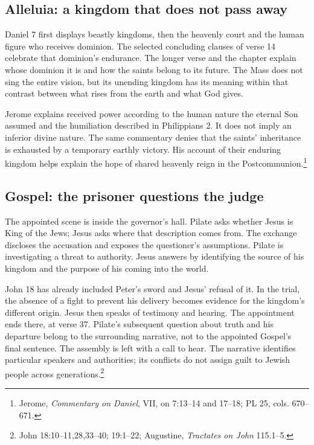 \subsection{Alleluia: a kingdom that does not pass away}
Daniel 7 first displays beastly kingdoms, then the heavenly court and the human figure who receives dominion. The selected concluding clauses of verse 14 celebrate that dominion's endurance. The longer verse and the chapter explain whose dominion it is and how the saints belong to its future. The Mass does not sing the entire vision, but its unending kingdom has its meaning within that contrast between what rises from the earth and what God gives.

Jerome explains received power according to the human nature the eternal Son assumed and the humiliation described in Philippians 2. It does not imply an inferior divine nature. The same commentary denies that the saints' inheritance is exhausted by a temporary earthly victory. His account of their enduring kingdom helps explain the hope of shared heavenly reign in the Postcommunion.\footnote{Jerome, \emph{Commentary on Daniel}, VII, on 7:13--14 and 17--18; PL 25, cols. 670--671.}

\subsection{Gospel: the prisoner questions the judge}
The appointed scene is inside the governor's hall. Pilate asks whether Jesus is King of the Jews; Jesus asks where that description comes from. The exchange discloses the accusation and exposes the questioner's assumptions. Pilate is investigating a threat to authority. Jesus answers by identifying the source of his kingdom and the purpose of his coming into the world.

John 18 has already included Peter's sword and Jesus' refusal of it. In the trial, the absence of a fight to prevent his delivery becomes evidence for the kingdom's different origin. Jesus then speaks of testimony and hearing. The appointment ends there, at verse 37. Pilate's subsequent question about truth and his departure belong to the surrounding narrative, not to the appointed Gospel's final sentence. The assembly is left with a call to hear. The narrative identifies particular speakers and authorities; its conflicts do not assign guilt to Jewish people across generations.\footnote{John 18:10--11,28,33--40; 19:1--22; Augustine, \emph{Tractates on John} 115.1--5.}

